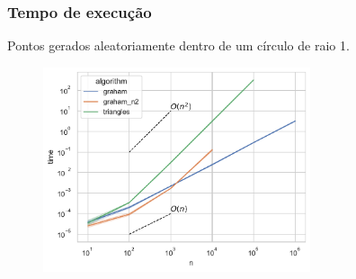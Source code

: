 \documentclass[aspectratio=169,usenames,dvipsnames]{beamer}
\begin{document}
\begin{frame}
\frametitle{Tempo de execução}
    Pontos gerados aleatoriamente dentro de um círculo de raio 1.
    \begin{figure}
        \includegraphics[width=0.7\textwidth]{./figs/time.pdf}
    \end{figure}
\end{frame}
\end{document}

